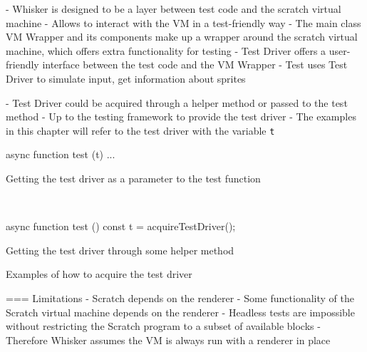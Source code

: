 - Whisker is designed to be a layer between test code and the scratch virtual machine
- Allows to interact with the VM in a test-friendly way
- The main class VM Wrapper and its components make up a wrapper around the scratch virtual machine,
  which offers extra functionality for testing
- Test Driver offers a user-friendly interface between the test code and the VM Wrapper
- Test uses Test Driver to simulate input, get information about sprites

- Test Driver could be acquired through a helper method or passed to the test method
- Up to the testing framework to provide the test driver
- The examples in this chapter will refer to the test driver with the variable \texttt{t}

\begin{listing}[ht]
    \centering
    \begin{minipage}[t]{.45\textwidth}
        \begin{javascriptcode}
            async function test (t) {
                ...
            }
        \end{javascriptcode}
        \vspace{-\bigskipamount}
        Getting the test driver as a parameter to the test function
    \end{minipage}
    ~
    \begin{minipage}[t]{.45\textwidth}
        \begin{javascriptcode}
            async function test () {
                const t = acquireTestDriver();
            }
        \end{javascriptcode}
        \vspace{-\bigskipamount}
        Getting the test driver through some helper method
    \end{minipage}
    \caption{Examples of how to acquire the test driver}
    \label{fig:examples_of_how_to_acquire_the_test_driver}
\end{listing}

=== Limitations
- Scratch depends on the renderer
    - Some functionality of the Scratch virtual machine depends on the renderer
    - Headless tests are impossible without restricting the Scratch program to a subset of available blocks
- Therefore Whisker assumes the VM is always run with a renderer in place

